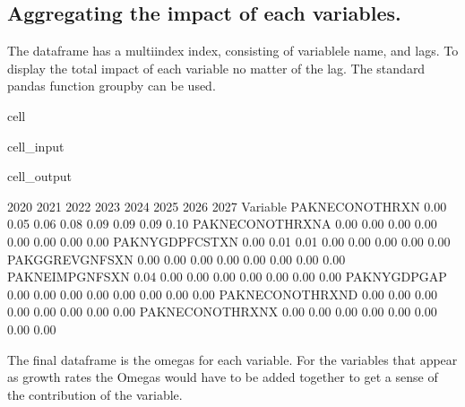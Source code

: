 \documentclass[letterpaper,10pt,english]{jupyterBook}
\begin{document}
\subsection{Aggregating the impact of each variables.}
\label{\detokenize{content/06_ModelAnalytics/Attribution:aggregating-the-impact-of-each-variables}}
\sphinxAtStartPar
The dataframe  has a multiindex index, consisting of variablele name, and lags. To display the total impact of each variable
no matter of the lag. The standard pandas function groupby can be used.

\begin{sphinxuseclass}{cell}\begin{sphinxVerbatimInput}

\begin{sphinxuseclass}{cell_input}
\begin{sphinxVerbatim}[commandchars=\\\{\}]
\end{sphinxVerbatim}

\end{sphinxuseclass}\end{sphinxVerbatimInput}
\begin{sphinxVerbatimOutput}

\begin{sphinxuseclass}{cell_output}
\begin{sphinxVerbatim}[commandchars=\\\{\}]
                  2020  2021  2022  2023  2024  2025  2026  2027
Variable                                                        
PAKNECONOTHRXN   \PYGZhy{}0.00  0.05  0.06  0.08  0.09  0.09  0.09  0.10
PAKNECONOTHRXN\PYGZus{}A \PYGZhy{}0.00 \PYGZhy{}0.00 \PYGZhy{}0.00 \PYGZhy{}0.00 \PYGZhy{}0.00 \PYGZhy{}0.00 \PYGZhy{}0.00 \PYGZhy{}0.00
PAKNYGDPFCSTXN    0.00  0.01  0.01  0.00  0.00  0.00 \PYGZhy{}0.00 \PYGZhy{}0.00
PAKGGREVGNFSXN   \PYGZhy{}0.00 \PYGZhy{}0.00 \PYGZhy{}0.00 \PYGZhy{}0.00 \PYGZhy{}0.00 \PYGZhy{}0.00 \PYGZhy{}0.00 \PYGZhy{}0.00
PAKNEIMPGNFSXN    0.04 \PYGZhy{}0.00 \PYGZhy{}0.00 \PYGZhy{}0.00 \PYGZhy{}0.00 \PYGZhy{}0.00 \PYGZhy{}0.00 \PYGZhy{}0.00
PAKNYGDPGAP\PYGZus{}      0.00  0.00  0.00  0.00  0.00 \PYGZhy{}0.00 \PYGZhy{}0.00 \PYGZhy{}0.00
PAKNECONOTHRXN\PYGZus{}D \PYGZhy{}0.00 \PYGZhy{}0.00 \PYGZhy{}0.00 \PYGZhy{}0.00 \PYGZhy{}0.00 \PYGZhy{}0.00 \PYGZhy{}0.00 \PYGZhy{}0.00
PAKNECONOTHRXN\PYGZus{}X \PYGZhy{}0.00 \PYGZhy{}0.00 \PYGZhy{}0.00 \PYGZhy{}0.00 \PYGZhy{}0.00 \PYGZhy{}0.00 \PYGZhy{}0.00 \PYGZhy{}0.00
\end{sphinxVerbatim}

\end{sphinxuseclass}\end{sphinxVerbatimOutput}

\end{sphinxuseclass}
\sphinxAtStartPar
The final dataframe is the omegas for each variable.  For the variables that appear as growth rates the Omegas would have to be added together to get a sense of the contribution of the variable.
\end{document}

